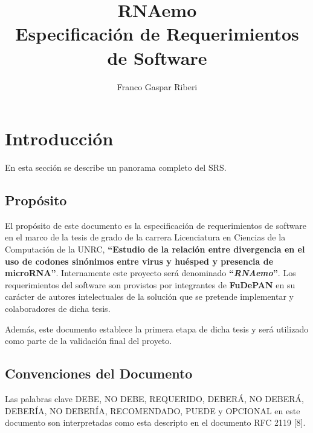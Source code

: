 \documentclass[12pt,a4paper,spanish]{article}
\title{\textbf{RNAemo}\\ \vspace{0.45cm} Especificación de Requerimientos de Software} %
\author{Franco Gaspar Riberi}
\newcommand{\rnaemo}{\textbf{\emph{RNAemo}}}
\begin{document}
\maketitle\pagebreak{}\tableofcontents{}\pagebreak{}

\newpage

\section{Introducción}
En esta sección se describe un panorama completo del SRS.

\subsection{Propósito}
\par El propósito de este documento es la especificación de requerimientos
de software en el marco de la tesis de grado de la carrera Licenciatura en
Ciencias de la Computación de la UNRC, \textbf{``Estudio de la relación entre divergencia en el uso de codones 
sinónimos entre virus y huésped y presencia de microRNA''}. Internamente este proyecto será denominado \textbf{``}\rnaemo\textbf{''}.
Los requerimientos del software son provistos por integrantes de \textbf{FuDePAN} en su carácter de autores
intelectuales de la solución que se pretende implementar y colaboradores
de dicha tesis.
\par Además, este documento establece la primera etapa de dicha tesis y será utilizado
como parte de la validación final del proyeto.

\subsection{Convenciones del Documento}
Las palabras clave DEBE, NO DEBE, REQUERIDO, DEBERÁ, NO DEBERÁ, DEBERÍA, NO DEBERÍA, RECOMENDADO, PUEDE y OPCIONAL
en este documento son interpretadas como esta descripto en el documento RFC
2119 [8]. 
\end{document}
